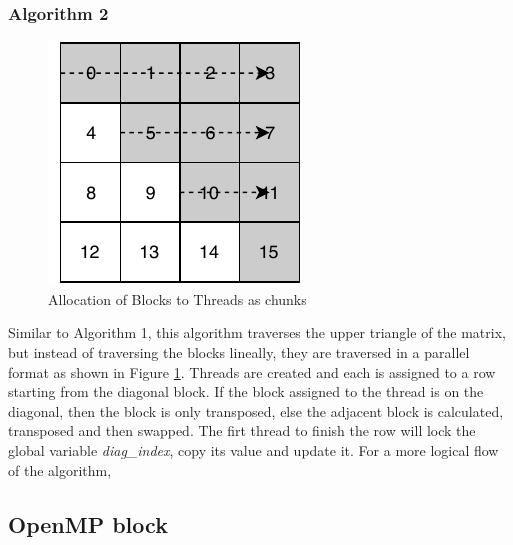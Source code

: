 \documentclass[10pt, onecolumn]{article}
\begin{document}
\subsubsection{Algorithm 2}
%
\begin{figure}[H]
    \centering
    \includegraphics{Documentation/BlockAlgorithm2ThreadAllocation.pdf}
    \caption{Allocation of Blocks to Threads as chunks}
    \label{fig:BlockAlgorithm2ThreadAllocation}
\end{figure}
%
Similar to Algorithm 1, this algorithm traverses the upper triangle of the matrix, but instead of traversing the blocks lineally, they are traversed in a parallel format as shown in Figure \ref{fig:BlockAlgorithm2ThreadAllocation}. Threads are created and each is assigned to a row starting from the diagonal block. If the block assigned to the thread is on the diagonal, then the block is only transposed, else the adjacent block is calculated, transposed and then swapped. The firt thread to finish the row will lock the global variable \emph{diag\_index}, copy its value and update it. For a more logical flow of the algorithm, 
\subsection{OpenMP block}
%
 
%
%
\end{document}
